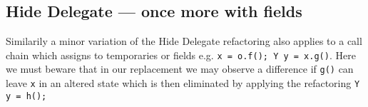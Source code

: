 \subsection*{Hide Delegate --- once more with fields}

Similarily a minor variation of the  Hide Delegate refactoring also applies to a call chain which assigns to temporaries or fields
e.g. \lstinline[style=smallJava]|x = o.f(); Y y = x.g()|. Here we must beware that in our replacement we may observe a difference
if \lstinline[style=smallJava]|g()| can leave \lstinline[style=smallJava]|x| in an altered state which is then eliminated by applying
the refactoring \lstinline[style=smallJava]|Y y = h();|




